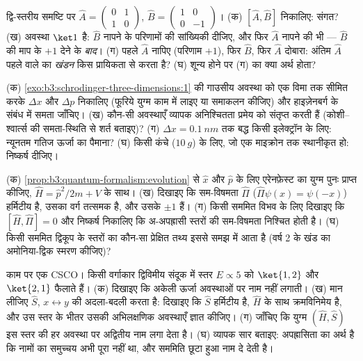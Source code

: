 \begin{exercise}[$\star\star$]\label{exo:b3:quantum-formalism:6}
द्वि-स्तरीय समष्टि पर $\hat A = \begin{pmatrix}0&1\\1&0
\end{pmatrix}$, $\hat B = \begin{pmatrix}1&0\\0&-1\end{pmatrix}$।
(क) $[\hat A, \hat B]$ निकालिए: संगत? (ख) अवस्था
$\ket1$ है: $\hat B$ नापने के परिणामों की सांख्यिकी दीजिए, और फिर
$\hat A$ नापने की भी --- $\hat B$ की माप के $+1$ देने के \emph{बाद}।
(ग) पहले $\hat A$ नापिए (परिणाम $+1$), फिर $\hat B$, फिर
$\hat A$ दोबारा: अंतिम $\hat A$ पहले वाले का \emph{खंडन}
किस प्रायिकता से करता है? (घ) शून्य  होने पर (ग) का क्या
अर्थ होता?
\end{exercise}

\begin{exercise}[$\star\star$]\label{exo:b3:quantum-formalism:7}
(क) \cref{exo:b3:schrodinger-three-dimensions:1} की गाउसीय अवस्था को
एक विमा तक सीमित करके
$\Delta x$ और $\Delta p$ निकालिए (फूरिये युग्म काम में लाइए या
समाकलन कीजिए) और हाइज़ेनबर्ग के संबंध में समता जाँचिए। (ख) कौन-सी
अवस्थाएँ व्यापक अनिश्चितता प्रमेय को संतृप्त करती हैं (कोशी--श्वार्त्स
की समता-स्थिति से शर्त बताइए)? (ग) $\Delta x = \qty{0.1}{nm}$ तक बद्ध
किसी इलेक्ट्रॉन के लिए: न्यूनतम गतिज ऊर्जा का पैमाना? (घ) किसी
कंचे ($\qty{10}{g}$) के लिए, जो एक माइक्रोन तक स्थानीकृत हो: निष्कर्ष दीजिए।
\end{exercise}

\begin{exercise}[$\star\star$]\label{exo:b3:quantum-formalism:8}
(क) \cref{prop:b3:quantum-formalism:evolution} से $\hat x$ और
$\hat p$ के लिए एरेनफ़ेस्ट का युग्म पुनः प्राप्त कीजिए, $\hat H = \hat
p^2/2m + V$ के साथ। (ख) दिखाइए कि सम-विषमता $\hat\Pi$ ($\hat\Pi\psi(x) =
\psi(-x)$) हर्मिटीय है, उसका वर्ग तत्समक है, और उसके
 $\pm1$ हैं। (ग) किसी सममित विभव के लिए दिखाइए कि
$[\hat H, \hat\Pi] = 0$ और निष्कर्ष निकालिए कि अ-अपह्रासी स्तरों की
सम-विषमता निश्चित होती है। (घ) किसी सममित द्विकूप के स्तरों का
कौन-सा प्रेक्षित तथ्य इससे समझ में आता है (वर्ष 2 के खंड का
अमोनिया-द्विक स्मरण कीजिए)?
\end{exercise}

\begin{exercise}[$\star\star$]\label{exo:b3:quantum-formalism:9}
काम पर एक CSCO। किसी वर्गाकार द्विविमीय संदूक में स्तर $E
\propto 5$ को $\ket{1,2}$ और $\ket{2,1}$ फैलाते हैं। (क) दिखाइए कि
अकेली ऊर्जा अवस्थाओं पर नाम नहीं लगाती। (ख) मान लीजिए $\hat S$, $x
\leftrightarrow y$ की अदला-बदली करता है: दिखाइए कि $\hat S$ हर्मिटीय
है, $\hat
H$ के साथ क्रमविनिमेय है, और उस स्तर के भीतर उसकी
अभिलक्षणिक अवस्थाएँ ज्ञात कीजिए। (ग) जाँचिए कि युग्म $(\hat H, \hat S)$ इस स्तर की
हर अवस्था पर अद्वितीय नाम लगा देता है। (घ) व्यापक सार बताइए:
अपह्रासिता का अर्थ है कि नामों का समुच्चय अभी पूरा नहीं था, और
सममिति छूटा हुआ नाम दे देती है।
\end{exercise}

